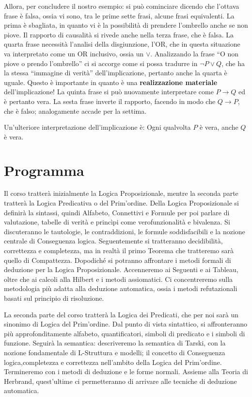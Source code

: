 Allora, per concludere il nostro esempio: si può cominciare dicendo che l'ottava 
frase è falsa, ossia vi sono, tra le prime sette frasi, alcune frasi equivalenti. 
La prima è sbagliata, in quanto vi è la possibilità di prendere l'ombrello 
anche se non piove. Il rapporto di causalità si rivede anche nella terza frase, 
che è falsa. La quarta frase necessità l'analisi della disgiunzione, l'OR, 
che in questa situazione va interpretato come un OR inclusivo, ossia un 
$\lor$. Analizzando la frase ``O non piove o prendo l'ombrello'' ci si accorge 
come si possa tradurre in $\neg P \lor Q$, che ha la stessa ``immagine di 
verità'' dell'implicazione, pertanto anche la quarta è uguale. Questo è importante 
in quanto è una \textbf{realizzazione materiale} dell'implicazione! 
La quinta frase si può nuovamente interpretare come $P\rightarrow Q$ ed è pertanto 
vera. 
La sesta frase inverte il rapporto, facendo in modo che $Q \rightarrow P$, che 
è falso; analogamente accade per la settima. 

Un'ulteriore interpretazione dell'implicazione è: Ogni qualvolta $P$ è vera, 
anche $Q$ è vera. 

\section{Programma}
Il corso tratterà inizialmente la Logica Proposizionale, mentre la seconda 
parte tratterà la Logica Predicativa o del Prim'ordine. Della Logica Proposizionale 
si definirà la sintassi, quindi Alfabeto, Connettivi e Formule per poi parlare
di valutazione, tabelle di verità e princìpi come verofunzionalità e bivalenza. 
Si discuteranno le tautologie, le contraddizioni, le formule soddisfacibili e
la nozione centrale di Conseguenza logica. Seguentemente si 
tratteranno decidibilità, correttezza e completezza, ma in realtà il primo Teorema 
che tratteremo sarà quello di Compattezza. Dopodiché si potranno affrontare 
i metodi formali di deduzione per la Logica Proposizionale. Accenneremo ai 
Seguenti e ai Tableau, oltre che ai calcoli alla Hilbert e i metodi assiomatici. 
Ci concentreremo sulla metodologia più adatta alla deduzione automatica, ossia 
i metodi refutazionali basati sul principio di risoluzione. 

La seconda parte del corso tratterà la Logica dei Predicati, che per noi 
sarà un sinonimo di Logica del Prim'ordine. Dal punto di vista sintattico, 
si affronteranno più approfonditamente alfabeto, quantificatori, simboli 
di predicato e i simboli di funzione. Seguirà la semantica: descriveremo la 
semantica di Tarski, con la nozione fondamentale di L-Struttura e modelli; il 
concetto di Conseguenza logica,completezza e correttezza nell'ambito 
della Logica del Prim'ordine. Termineremo con i metodi di deduzione e le forme 
normali. Assieme alla Teoria di Herbrand, quest'ultime ci permetteranno di 
arrivare alle tecniche di deduzione automatica. 
